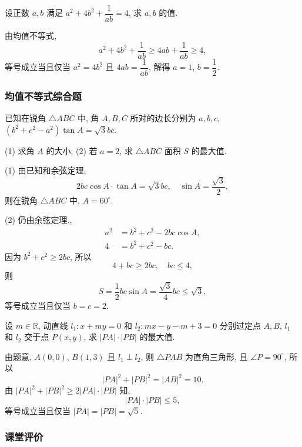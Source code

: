 \lianxi
\begin{exercise}[s]
    设正数 $a,b$ 满足 $a^2+4b^2+\dfrac1{ab}= 4$, 求 $a,b$ 的值.
\end{exercise}
\beginsolution
    由均值不等式,
    \[a^2+4b^2+\frac1{ab}\geqslant 4ab+ \frac1{ab}
    \geqslant 4,\]
    等号成立当且仅当 $a^2= 4b^2$ 且 $4ab= \dfrac1{ab}$, 解得 $a=1$, $b= \dfrac12$.
\endsolution

\subsubsection{均值不等式综合题}
\begin{example}
    已知在锐角 $\triangle ABC$ 中, 角 $A,B,C$ 所对的边长分别为 $a,b,c$, $(b^2 +c^2 -a^2)\tan A=\sqrt3 bc$.
    
    (1) 求角 $A$ 的大小;\qquad
    (2) 若 $a=2$, 求 $\triangle ABC$ 面积 $S$ 的最大值.
\end{example}
\beginsolution
    (1) 由已知和余弦定理,
    \[2bc\cos A\cdot \tan A= \sqrt3bc,\quad 
    \sin A= \frac{\sqrt3}2,\]
    则在锐角 $\triangle ABC$ 中, $A= 60^\circ$.

    (2) 仍由余弦定理.,
    \[\begin{aligned}
        a^2&= b^2+c^2- 2bc\cos A,\\
        4&= b^2+c^2- bc.
    \end{aligned}\]
    因为 $b^2+c^2\geqslant 2bc$, 所以
    \[4+bc\geqslant 2bc,\quad bc\leqslant 4,\]
    则
    \[S= \frac12bc\sin A= \frac{\sqrt3}{4}bc
    \leqslant \sqrt3,\]
    等号成立当且仅当 $b=c=2$.
\endsolution

\lianxi
\begin{exercise}[s]
    设 $m\in\mathbb{R}$, 动直线 $l_1\colon x+my=0$ 和 $l_2\colon mx-y-m+3=0$ 分别过定点 $A,B$, $l_1$ 和 $l_2$ 交于点 $P(x,y)$, 求 $|PA|\cdot |PB|$ 的最大值.
\end{exercise}
\beginsolution
    由题意, $A(0,0)$, $B(1,3)$ 且 $l_1\perp l_2$, 则 $\triangle PAB$ 为直角三角形, 且 $\angle P= 90^\circ$, 所以
    \[|PA|^2+ |PB|^2= |AB|^2= 10.\]
    由 $|PA|^2+ |PB|^2\geqslant 2|PA|\cdot |PB|$ 知,
    \[|PA|\cdot |PB|\leqslant 5,\]
    等号成立当且仅当 $|PA|=|PB|= \sqrt5$.
\endsolution

\subsubsection{课堂评价}

